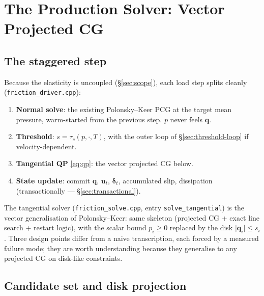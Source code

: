 \documentclass[11pt,a4paper]{article}
\newcommand{\bq}{\mathbf{q}}
\newcommand{\bu}{\mathbf{u}}
\newcommand{\bdelta}{\boldsymbol{\delta}}
\newcommand{\abs}[1]{\lvert#1\rvert}
\newcommand{\code}[1]{\texttt{#1}}
\begin{document}
\section{The Production Solver: Vector Projected CG}
\label{sec:solver}

\subsection{The staggered step}

Because the elasticity is uncoupled (\S\ref{sec:scope}), each load step
splits cleanly (\code{friction\_driver.cpp}):
\begin{enumerate}
\item \textbf{Normal solve}: the existing Polonsky--Keer PCG at the target
  mean pressure, warm-started from the previous step. $p$ never feels $\bq$.
\item \textbf{Threshold}: $s = \tau_c(p, \cdot, T)$, with the outer loop of
  \S\ref{sec:threshold-loop} if velocity-dependent.
\item \textbf{Tangential QP} \eqref{eq:qp}: the vector projected CG below.
\item \textbf{State update}: commit $\bq$, $\bu_t$, $\bdelta_t$, accumulated
  slip, dissipation (transactionally --- \S\ref{sec:transactional}).
\end{enumerate}

The tangential solver (\code{friction\_solve.cpp}, entry
\code{solve\_tangential}) is the vector generalisation of Polonsky--Keer:
same skeleton (projected CG + exact line search + restart logic), with the
scalar bound $p_i \ge 0$ replaced by the disk $\abs{\bq_i} \le s_i$. Three
design points differ from a naive transcription, each forced by a measured
failure mode; they are worth understanding because they generalise to any
projected CG on disk-like constraints.

\subsection{Candidate set and disk projection}
\end{document}
